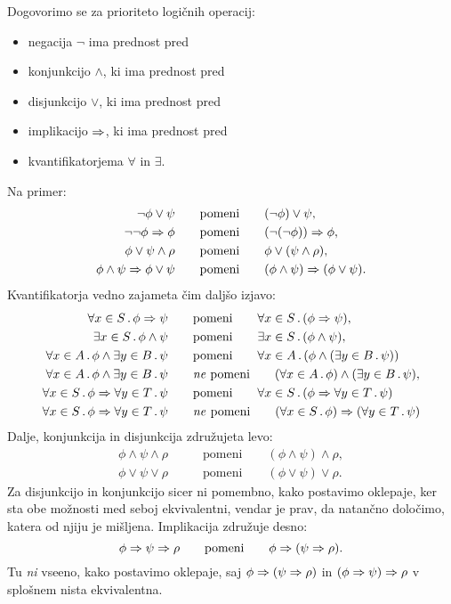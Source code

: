 Dogovorimo se za prioriteto logičnih operacij:
%
\begin{itemize}
\item negacija $\lnot$ ima prednost pred
\item konjunkcijo $\land$, ki ima prednost pred
\item disjunkcijo $\lor$, ki ima prednost pred
\item implikacijo $\Rightarrow$, ki ima prednost pred
\item kvantifikatorjema $\forall$ in $\exists$.
\end{itemize}
%
Na primer:
%
\begin{align*}
  \lnot \phi \lor \psi
   &\qquad\text{pomeni}\qquad (\lnot \phi) \lor \psi, \\
  \lnot \lnot \phi \Rightarrow \phi
   &\qquad\text{pomeni}\qquad (\lnot(\lnot\phi)) \Rightarrow \phi, \\
  \phi \lor \psi \land \rho
   &\qquad\text{pomeni}\qquad \phi \lor (\psi \land \rho), \\
  \phi \land \psi \Rightarrow \phi \lor \psi
   &\qquad\text{pomeni}\qquad (\phi \land \psi) \Rightarrow (\phi \lor \psi).
\end{align*}
%
Kvantifikatorja vedno zajameta čim daljšo izjavo:
%
\begin{align*}
  \forall x \in S \,.\, \phi \Rightarrow \psi
    &\qquad\text{pomeni}\qquad \forall x \in S \,.\, (\phi \Rightarrow \psi), \\
  \exists x \in S \,.\, \phi \land \psi
    &\qquad\text{pomeni}\qquad \exists x \in S \,.\, (\phi \land \psi), \\
  \forall x \in A \,.\, \phi \land \exists y \in B \,.\, \psi
    &\qquad\text{pomeni}\qquad
  \forall x \in A \,.\, (\phi \land (\exists y \in B \,.\, \psi)) \\
  \forall x \in A \,.\, \phi \land \exists y \in B \,.\, \psi
    &\qquad\text{\emph{ne} pomeni}\qquad
    (\forall x \in A \,.\, \phi) \land (\exists y \in B \,.\, \psi), \\
  \forall x \in S \,.\, \phi \Rightarrow \forall y \in T \,.\, \psi
    &\qquad\text{pomeni}\qquad
  \forall x \in S \,.\, (\phi \Rightarrow \forall y \in T \,.\, \psi) \\
  \forall x \in S \,.\, \phi \Rightarrow \forall y \in T \,.\, \psi
    &\qquad\text{\emph{ne }pomeni}\qquad
  (\forall x \in S \,.\, \phi) \Rightarrow (\forall y \in T \,.\, \psi) \\
\end{align*}
%
Dalje, konjunkcija in disjunkcija združujeta levo:
% 
\begin{align*}
  \phi \land \psi \land \rho
  &\qquad\text{pomeni}\qquad
  (\phi \land \psi) \land \rho,\\
  \phi \lor \psi \lor \rho
  &\qquad\text{pomeni}\qquad
  (\phi \lor \psi) \lor \rho.
\end{align*}
%
Za disjunkcijo in konjunkcijo sicer ni pomembno, kako postavimo
oklepaje, ker sta obe možnosti med seboj ekvivalentni, vendar je prav,
da natančno določimo, katera od njiju je mišljena.
Implikacija združuje desno:
%
\begin{equation*}
  \phi \Rightarrow \psi \Rightarrow \rho
  \qquad\text{pomeni}\qquad
  \phi \Rightarrow (\psi \Rightarrow \rho).
\end{equation*}
%
Tu \emph{ni} vseeno, kako postavimo oklepaje, saj $\phi \Rightarrow (\psi
\Rightarrow \rho)$ in $(\phi \Rightarrow \psi) \Rightarrow \rho$ v splošnem nista
ekvivalentna.

